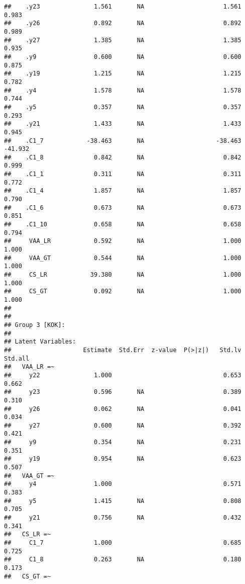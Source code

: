 \documentclass[
]{article}
\begin{document}
\begin{verbatim}
##    .y23               1.561       NA                      1.561    0.983
##    .y26               0.892       NA                      0.892    0.989
##    .y27               1.385       NA                      1.385    0.935
##    .y9                0.600       NA                      0.600    0.875
##    .y19               1.215       NA                      1.215    0.782
##    .y4                1.578       NA                      1.578    0.744
##    .y5                0.357       NA                      0.357    0.293
##    .y21               1.433       NA                      1.433    0.945
##    .C1_7            -38.463       NA                    -38.463  -41.932
##    .C1_8              0.842       NA                      0.842    0.999
##    .C1_1              0.311       NA                      0.311    0.772
##    .C1_4              1.857       NA                      1.857    0.790
##    .C1_6              0.673       NA                      0.673    0.851
##    .C1_10             0.658       NA                      0.658    0.794
##     VAA_LR            0.592       NA                      1.000    1.000
##     VAA_GT            0.544       NA                      1.000    1.000
##     CS_LR            39.380       NA                      1.000    1.000
##     CS_GT             0.092       NA                      1.000    1.000
## 
## 
## Group 3 [KOK]:
## 
## Latent Variables:
##                    Estimate  Std.Err  z-value  P(>|z|)   Std.lv  Std.all
##   VAA_LR =~                                                             
##     y22               1.000                               0.653    0.662
##     y23               0.596       NA                      0.389    0.310
##     y26               0.062       NA                      0.041    0.034
##     y27               0.600       NA                      0.392    0.421
##     y9                0.354       NA                      0.231    0.351
##     y19               0.954       NA                      0.623    0.507
##   VAA_GT =~                                                             
##     y4                1.000                               0.571    0.383
##     y5                1.415       NA                      0.808    0.705
##     y21               0.756       NA                      0.432    0.341
##   CS_LR =~                                                              
##     C1_7              1.000                               0.685    0.725
##     C1_8              0.263       NA                      0.180    0.173
##   CS_GT =~                                                              

\end{verbatim}
\end{document}
